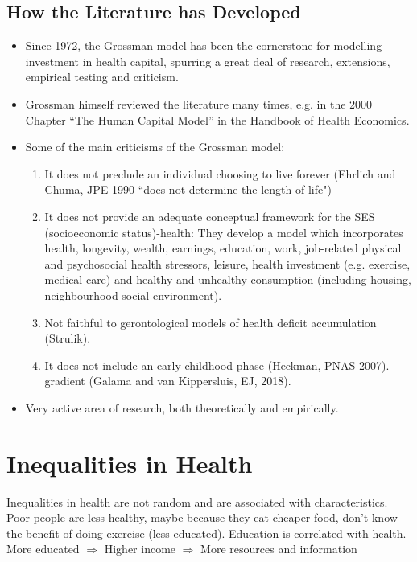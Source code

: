 \subsection{How the Literature has Developed}
\begin{itemize}
        \item Since 1972, the Grossman model has been the cornerstone for modelling
investment in health capital, spurring a great deal of research, extensions, 
empirical testing and criticism.
        \item Grossman himself reviewed the literature many times, e.g. in the 2000 Chapter “The Human Capital Model” in the Handbook of Health Economics.
        \item Some of the main criticisms of the Grossman model:
        \begin{enumerate}
            \item It does not preclude an individual choosing to live forever (Ehrlich and Chuma, JPE 1990 “does not determine the length of life")
            \item It does not provide an adequate conceptual framework for the SES (socioeconomic status)-health: They develop a model which incorporates health, longevity, wealth, earnings, education, work, job-related physical and psychosocial health stressors, leisure, health investment (e.g. exercise, medical care) and healthy and unhealthy consumption (including housing, neighbourhood social environment).
            \item Not faithful to gerontological models of health deficit accumulation (Strulik).
            \item It does not include an early childhood phase (Heckman, PNAS 2007).
gradient (Galama and van Kippersluis, EJ, 2018).
        \end{enumerate}
        \item Very active area of research, both theoretically and empirically.
\end{itemize}

\section{Inequalities in Health}
Inequalities in health are not random and are associated with characteristics. Poor people are less healthy, maybe because they eat cheaper food, don't know the benefit of doing exercise (less educated). Education is correlated with health. 
More educated  $\Rightarrow$  Higher income  $\Rightarrow$  More resources and information

